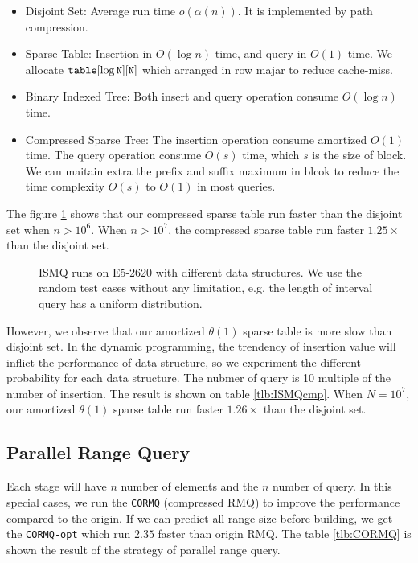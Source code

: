 \begin{itemize}
  \item 

Disjoint Set: Average run time $o(\alpha(n))$.  It is implemented by
path compression.

  \item 

Sparse Table: Insertion in $O(\log n)$ time, and query in $O(1)$ time.
We allocate $\tt{table}[\log N][N]$ which arranged in row majar to
reduce cache-miss.

  \item 

Binary Indexed Tree: Both insert and query operation consume $O(\log
n)$ time.

  \item 

Compressed Sparse Tree: The insertion operation consume amortized
$O(1)$ time.  The query operation consume $O(s)$ time, which $s$ is
the size of block.  We can maitain extra the prefix and suffix maximum
in blcok to reduce the time complexity $O(s)$ to $O(1)$ in most
queries.

\end{itemize}

The figure \ref{fig:fig-ISMQcmp} shows that our compressed sparse
table run faster than the disjoint set when $n > 10^6$.  When $n >
10^7$, the compressed sparse table run faster $1.25 \times$ than the
disjoint set.  

\begin{figure}[!thb]
  \centering
  
  \caption{ISMQ runs on E5-2620 with different data structures. We use the random test cases without any limitation, e.g. the length of interval query has a uniform distribution.}
  \label{fig:fig-ISMQcmp}
\end{figure}

However, we observe that our amortized $\theta(1)$ sparse table is more
slow than  disjoint set.  In the dynamic programming, the trendency of insertion value will inflict the performance of data structure, so we experiment the different probability for each data structure.  The nubmer of query is 10 multiple of the number of insertion.  The result is shown on table \ref{tlb:ISMQcmp}.  When $N=10^7$, our amortized $\theta(1)$ sparse table run faster $1.26 \times$ than the disjoint set.



\subsection{Parallel Range Query}

Each stage will have $n$ number of elements and the $n$ number of query.  In this special cases, we run the \texttt{CORMQ} (compressed RMQ) to improve the performance compared to the origin.  If we can predict all range size before building, we get the \texttt{CORMQ-opt} which run $2.35$ faster than origin RMQ.  The table \ref{tlb:CORMQ} is shown the result of the strategy of parallel range query.

